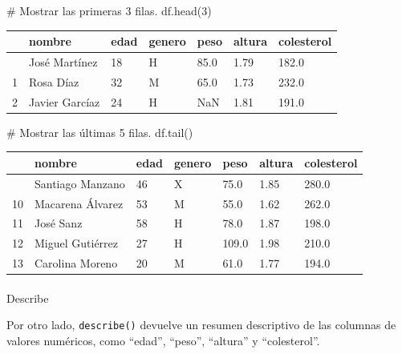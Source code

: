 \documentclass[
  letterpaper,
  DIV=11,
  numbers=noendperiod]{scrreprt}
\makeatletter
\let\oldparagraph\paragraph
\renewcommand{\paragraph}{
    \@ifstar
      \xxxParagraphStar
      \xxxParagraphNoStar
  }
\newcommand{\xxxParagraphStar}[1]{\oldparagraph*{#1}\mbox{}}
\newcommand{\xxxParagraphNoStar}[1]{\oldparagraph{#1}\mbox{}}
\newenvironment{Shaded}{\begin{snugshade}}{\end{snugshade}}
\newcommand{\CommentTok}[1]{\textcolor[rgb]{0.37,0.37,0.37}{#1}}
\newcommand{\DecValTok}[1]{\textcolor[rgb]{0.68,0.00,0.00}{#1}}
\newcommand{\NormalTok}[1]{\textcolor[rgb]{0.00,0.23,0.31}{#1}}
\makeatother
\begin{document}
\begin{Shaded}
\begin{Highlighting}[]
\CommentTok{\# Mostrar las primeras 3 filas.}
\NormalTok{df.head(}\DecValTok{3}\NormalTok{)}
\end{Highlighting}
\end{Shaded}

\begin{longtable}[]{@{}lllllll@{}}
\toprule\noalign{}
& nombre & edad & genero & peso & altura & colesterol \\
\midrule\noalign{}
\endhead
\bottomrule\noalign{}
\endlastfoot
0 & José Martínez & 18 & H & 85.0 & 1.79 & 182.0 \\
1 & Rosa Díaz & 32 & M & 65.0 & 1.73 & 232.0 \\
2 & Javier Garcíaz & 24 & H & NaN & 1.81 & 191.0 \\
\end{longtable}

\begin{Shaded}
\begin{Highlighting}[]
\CommentTok{\# Mostrar las últimas 5 filas.}
\NormalTok{df.tail()}
\end{Highlighting}
\end{Shaded}

\begin{longtable}[]{@{}lllllll@{}}
\toprule\noalign{}
& nombre & edad & genero & peso & altura & colesterol \\
\midrule\noalign{}
\endhead
\bottomrule\noalign{}
\endlastfoot
9 & Santiago Manzano & 46 & X & 75.0 & 1.85 & 280.0 \\
10 & Macarena Álvarez & 53 & M & 55.0 & 1.62 & 262.0 \\
11 & José Sanz & 58 & H & 78.0 & 1.87 & 198.0 \\
12 & Miguel Gutiérrez & 27 & H & 109.0 & 1.98 & 210.0 \\
13 & Carolina Moreno & 20 & M & 61.0 & 1.77 & 194.0 \\
\end{longtable}

\hfill\break

\paragraph{Describe}\label{describe}

Por otro lado, \texttt{describe()} devuelve un resumen descriptivo de
las columnas de valores numéricos, como ``edad'', ``peso'', ``altura'' y
``colesterol''.
\end{document}
